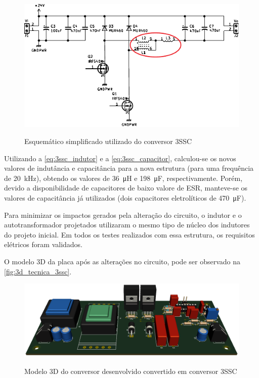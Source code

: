     \begin{figure}[H]
    	\centering
    	\caption{Esquemático simplificado utilizado do conversor 3SSC}
    	\includegraphics[scale=1.5]{pdf/layout/Esquematico_3ssc.pdf}
        \label{fig:esquematico_cbi_5}
    \end{figure}
    
    Utilizando a \autoref{eq:3ssc_indutor} e a \autoref{eq:3ssc_capacitor}, calculou-se os novos valores de indutância e capacitância para a nova estrutura (para uma frequência de \qty{20}{\kilo\hertz}), obtendo os valores de \qty{36}{\micro\henry} e \qty{198}{\micro\farad}, respectivamente. Porém, devido a disponibilidade de capacitores de baixo valore de ESR, manteve-se os valores de capacitância já utilizados (dois capacitores eletrolíticos de \qty{470}{\micro\farad}). 
    
    Para minimizar os impactos gerados pela alteração do circuito, o indutor e o autotransformador projetados utilizaram o mesmo tipo de núcleo dos indutores do projeto inicial. Em todos os testes realizados com essa estrutura, os requisitos elétricos foram validados. 
    
    O modelo 3D da placa após as alterações no circuito, pode ser observado na \autoref{fig:3d_tecnica_3ssc}.
    
    \begin{figure}[H]
    	\centering
    	\caption{Modelo 3D do conversor desenvolvido convertido em conversor 3SSC}
    	\includegraphics[scale=.35]{pdf/fotos/tecnica_3ssc.png}
        \label{fig:3d_tecnica_3ssc}
    \end{figure}
    
